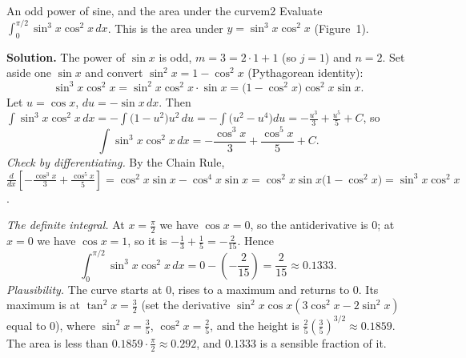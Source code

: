 \documentclass[11pt]{article}
\begin{document}
\begin{exmp}{An odd power of sine, and the area under the curve}{m2}
Evaluate $\displaystyle\int_0^{\pi/2}\sin^3x\cos^2x\,dx$. This is the area under $y=\sin^3x\cos^2x$ (Figure~1).

\textbf{Solution.} The power of $\sin x$ is odd, $m=3=2\cdot1+1$ (so $j=1$) and $n=2$. Set aside one $\sin x$ and convert $\sin^2x=1-\cos^2x$ (Pythagorean identity):
\[\sin^3x\cos^2x=\sin^2x\cos^2x\cdot\sin x=\big(1-\cos^2x\big)\cos^2x\sin x .\]
Let $u=\cos x$, $du=-\sin x\,dx$. Then $\int\sin^3x\cos^2x\,dx=-\int\big(1-u^2\big)u^2\,du=-\int\big(u^2-u^4\big)du=-\frac{u^3}3+\frac{u^5}5+C$, so
\[\int\sin^3x\cos^2x\,dx=-\frac{\cos^3x}3+\frac{\cos^5x}5+C .\]
\emph{Check by differentiating.} By the Chain Rule, $\frac{d}{dx}\left[-\frac{\cos^3x}3+\frac{\cos^5x}5\right]=\cos^2x\sin x-\cos^4x\sin x=\cos^2x\sin x\big(1-\cos^2x\big)=\sin^3x\cos^2x$.

\emph{The definite integral.} At $x=\frac\pi2$ we have $\cos x=0$, so the antiderivative is $0$; at $x=0$ we have $\cos x=1$, so it is $-\frac13+\frac15=-\frac2{15}$. Hence
\[\int_0^{\pi/2}\sin^3x\cos^2x\,dx=0-\left(-\frac2{15}\right)=\frac2{15}\approx0.1333 .\]
\emph{Plausibility.} The curve starts at $0$, rises to a maximum and returns to $0$. Its maximum is at $\tan^2x=\frac32$ (set the derivative $\sin^2x\cos x\left(3\cos^2x-2\sin^2x\right)$ equal to $0$), where $\sin^2x=\frac35$, $\cos^2x=\frac25$, and the height is $\frac25\left(\frac35\right)^{3/2}\approx0.1859$. The area is less than $0.1859\cdot\frac\pi2\approx0.292$, and $0.1333$ is a sensible fraction of it.


\end{exmp}
\end{document}
